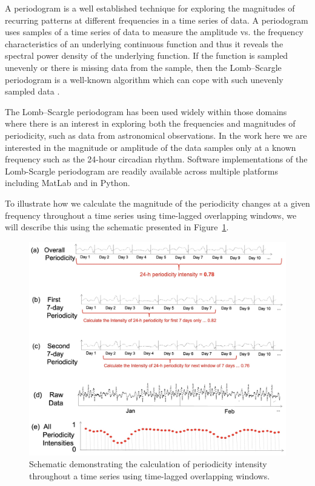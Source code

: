 \documentclass[preprints,article,accept,pdftex,moreauthors]{Definitions/mdpi}
\begin{document}
A periodogram \cite{bartlett1950periodogram} is a well established technique for exploring the magnitudes of recurring patterns at different frequencies in a time series of data.  A periodogram uses samples of {a time series of} data to measure the amplitude vs. the frequency characteristics of a{n underlying} continuous function and thus {it} reveals the spectral power density of the underlying function.  If the function is sampled unevenly or there is missing data from the sample, then the Lomb–Scargle periodogram is a well-known algorithm which can cope with such unevenly sampled data \cite{VanderPlas_2018}.  

The Lomb–Scargle periodogram has been used widely within those domains where there is an interest in exploring both the frequencies and  magnitudes of periodicity, such as data from astronomical observations.  In the work here we are interested in the magnitude or amplitude of the data samples only at a known frequency {such as the 24-hour circadian rhythm}. Software implementations of the Lomb-Scargle periodogram are readily  available across multiple platforms including MatLab and in Python.

To illustrate how we calculate the magnitude of the periodicity changes at a given frequency throughout a time series 
 using time-lagged overlapping windows, we {will describe this using}  the schematic presented in Figure~\ref{fig:periodicity}.

\begin{figure}[H]
\includegraphics[width=\linewidth]{Periodicity-aggregated.jpg}
\caption{Schematic demonstrating the calculation of periodicity intensity throughout a time series using time-lagged overlapping windows.\label{fig:periodicity}}
\end{figure}   
\end{document}
